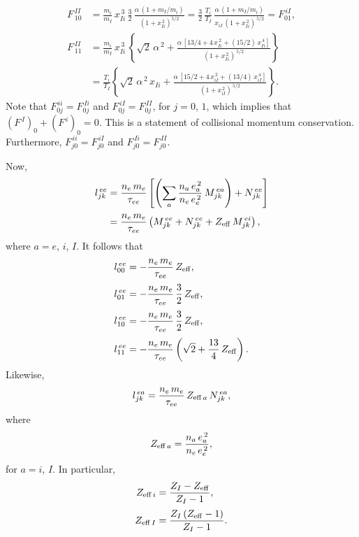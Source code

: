 \documentclass[12pt]{article}
\begin{document}
\begin{align}
F^{\,II}_{\,10}&=\frac{m_i}{m_I}\,x_{Ii}^{\,3}\,\frac{3}{2}\,\frac{\alpha\,(1+m_I/m_i)}{(1+x_{Ii}^{\,2})^{5/2}}=\frac{3}{2}\,\frac{T_i}{T_I}\,\frac{\alpha\,(1+m_I/m_i)}{x_{iI}\,(1+x_{Ii}^{\,2})^{\,5/2}}=F^{\,iI}_{01},\\[0.5ex]
F^{\,II}_{\,11}& =\frac{m_i}{m_I}\,x_{Ii}^{\,3}\,\left\{\sqrt{2}\,\alpha^{\,2}+
\frac{\alpha\,[13/4+4\,x_{Ii}^{\,2}+(15/2)\,x_{Ii}^{\,4}]}{(1+x_{Ii}^{\,2})^{\,5/2}}
\right\}\nonumber\\[0.5ex]
&=\frac{T_i}{T_I}\left\{\sqrt{2}\,\alpha^{\,2}\,x_{Ii} + \frac{\alpha\,[
15/2+4\,x_{iI}^{\,2}+(13/4)\,x_{iI}^{\,4}]}{(1+x_{iI}^{\,2})^{\,5/2}}\right\}.
\end{align}
Note that $F^{\,ii}_{0j}=F^{\,Ii}_{0j}$ and $F^{\,iI}_{0j}=F^{\,II}_{0j}$, for $j=0$, $1$, which implies
that $(F^{\,I})_0+(F^{\,i})_0= 0$. This is a statement of collisional momentum conservation.
Furthermore, $F^{\,ii}_{j0}=F^{\,iI}_{j0}$ and $F^{\,Ii}_{j0}=F^{\,II}_{j0}$. 

Now,
\begin{align}
l_{jk}^{\,ee} & = \frac{n_e\,m_e}{\tau_{ee}}\left[\left(\sum_a \frac{n_a\,e_a^{\,2}}{n_e\,e_e^{\,2}}\,M^{\,ea}_{jk}\right) + N^{\,ee}_{jk}\right]\\[0.5ex]
&= \frac{n_e\,m_e}{\tau_{ee}}\left(M^{\,ee}_{jk}+N^{\,ee}_{jk}+Z_{\rm eff}\,M^{\,ei}_{jk}\right),
\end{align}
where $a= e$, $i$, $I$. 
It follows that 
\begin{align}
l^{\,ee}_{00} &= -\frac{n_e\,m_e}{\tau_{ee}}\,Z_{\rm eff},\\[0.5ex]
l^{\,ee}_{01}&= -\frac{n_e\,m_e}{\tau_{ee}}\,\frac{3}{2}\,Z_{\rm eff},\\[0.5ex]
l^{\,ee}_{10}&= -\frac{n_e\,m_e}{\tau_{ee}}\,\frac{3}{2}\,Z_{\rm eff},\\[0.5ex]
l^{\,ee}_{11}& =- \frac{n_e\,m_e}{\tau_{ee}}\left(\sqrt{2} + \frac{13}{4}\,Z_{\rm eff}\right).
\end{align}
Likewise,
\begin{equation}
l_{jk}^{\,ea} = \frac{n_e\,m_e}{\tau_{ee}}\,Z_{{\rm eff}\,a}\,N^{\,ea}_{jk},
\end{equation}
where 
\begin{equation}
Z_{{\rm eff}\,a}= \frac{n_a\,e_a^{\,2}}{n_e\,e_e^{\,2}},
\end{equation}
 for $a=i$, $I$. In particular, 
 \begin{align}
Z_{{\rm eff}\,i}&=\frac{Z_I-Z_{\rm eff}}{Z_I-1},\\[0.5ex]
Z_{{\rm eff}\,I}&= \frac{Z_I\,(Z_{\rm eff}-1)}{Z_I-1}.
\end{align}
\end{document}
